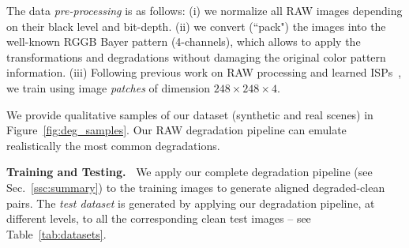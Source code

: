\documentclass{article}
\begin{document}
\begin{table}[t]
    \centering
    \caption{Dataset split. The sensors highlighted in gray correspond to our collected images. We indicate the type of sensor, (B) Bayer and (Q) Quad, for the last one, we obtained the RAW images after remosaicing. We indicate the resolution (Res.) of the patches extracted from the full images. We use public ZRR~\cite{ignatov2020replacing} and Raw2Raw~\cite{afifi2021raw2raw}.
    }
    \label{tab:datasets}
\end{table}



The data \emph{pre-processing} is as follows: (i) we normalize all RAW images depending on their black level and bit-depth. (ii) we convert (``pack") the images into the well-known RGGB Bayer pattern (4-channels), which allows to apply the transformations and degradations without damaging the original color pattern information. (iii) Following previous work on RAW processing and learned ISPs~\cite{xu2019rawsr}, we train using image \emph{patches} of dimension $248\times248\times4$. 

We provide qualitative samples of our dataset (synthetic and real scenes) in Figure~\ref{fig:deg_samples}. Our RAW degradation pipeline can emulate realistically the most common degradations.

\vspace{2mm}
\noindent\textbf{Training and Testing.~} 
We apply our complete degradation pipeline (see Sec.~\ref{ssc:summary}) to the training images to generate aligned degraded-clean pairs. The \emph{test dataset} is generated by applying our degradation pipeline, at different levels, to all the corresponding clean test images -- see Table~\ref{tab:datasets}. 
\end{document}
